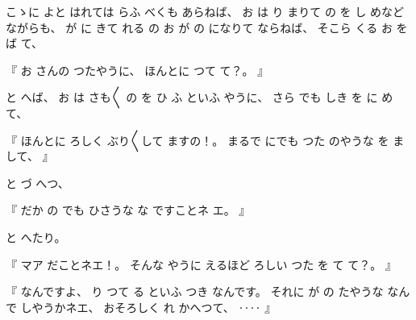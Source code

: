 
%
こゝに
よと
はれては
らふ
べくも
あらねば、
%
お
は
り
まりて%
の
を
し
めなど
ながらも、
%
が
に
きて
れる
の
お
が
の
になりて
ならねば、%
%
そこら
くる
お
をば
て、

%
『
お
さんの
つたやうに、
%
ほんとに
つて%
て？。
』

%
と
へば、
%
お
は
さも〳〵
の
を
ひ
ふ
といふ
やうに、
%
さら
でも
しき
を
に
めて、

%
『
ほんとに
ろしく
ぶり〳〵して
ますの！。
%
まるで
にでも
つた%
のやうな
を
まして、
』

%
と
づ
へつ、

%
『
だか
の
でも
ひさうな
な
ですことネ
エ。
』

%
と
へたり。

%
『
マア
だことネエ！。
%
そんな
やうに
えるほど
ろしい
つた
を
て
て？。
』

%
『
なんですよ、
%
り
つて
る
といふ
つき
なんです。
%
それに
が
の
たやうな
なんで
しやうかネエ、
%
おそろしく
れ
かへつて、
%
‥‥
』

